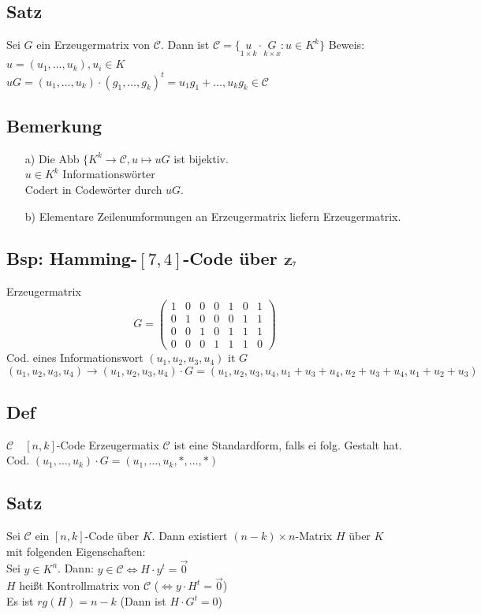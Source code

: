 \subsection{Satz}
Sei $G$ ein Erzeugermatrix von $\mathcal{C}$. Dann ist $\mathcal{C} = \lbrace \underset{1\times k}{u} \cdot \underset{k\times x}{G}: u \in K^k \rbrace$
Beweis: $u=(u_1,\ldots,u_k),u_i\in K$\\
$uG=(u_1,\ldots,u_k) \cdot (g_1,\ldots,g_k)^t=u_1g_1+\ldots,u_kg_k \in \mathcal{C}$\\
\subsection{Bemerkung}
\begin{itemize}
	\item[a)] Die Abb $\lbrace K^k \rightarrow \mathcal{C}, u \longmapsto uG$ ist bijektiv. \\
	$u \in K^k$ Informationsw\"orter \\
	Codert in Codew\"orter durch $uG$.
	\item[b)] Elementare Zeilenumformungen an Erzeugermatrix liefern Erzeugermatrix.
\end{itemize}
\subsection{Bsp: Hamming-$[7,4]$-Code \"uber $\Z_7$}
%
%
\noindent
Erzeugermatrix
\[	G=
	\begin{pmatrix}
		1 & 0 & 0 & 0 & 1 & 0 & 1\\
		0 & 1 & 0 & 0 & 0 & 1 & 1\\
		0 & 0 & 1 & 0 & 1 & 1 & 1\\
		0 & 0 & 0 & 1 & 1 & 1 & 0
	\end{pmatrix}
\]
Cod. eines Informationswort $(u_1,u_2,u_3,u_4)$ it $G$
\[
	(u_1,u_2,u_3,u_4) \rightarrow (u_1,u_2,u_3,u_4) \cdot G =  (u_1,u_2,u_3,u_4,u_1+u_3+u_4,u_2+u_3+u_4,u_1+u_2+u_3)
\]
\subsection{Def}
$\mathcal{C} \quad [n,k]$-Code Erzeugermatix $\mathcal{C}$ ist eine Standardform, falls ei folg. Gestalt hat.
%
%
Cod. $(u_1,\ldots,u_k) \cdot G = (u_1,\ldots,u_k,*,\ldots,*)$
\subsection{Satz}
Sei $\mathcal{C}$ ein $[n,k]$-Code \"uber $K$. Dann existiert $(n-k)\times n$-Matrix $H$ \"uber $K$ mit folgenden Eigenschaften: \\
Sei $y\in K^n$. Dann: $y \in \mathcal{C} \Leftrightarrow H \cdot y^t = \vec{0}$ 
\\
$H$ hei\ss t Kontrollmatrix von $\mathcal{C}$ ($\Leftrightarrow y \cdot H^t = \vec{0}$) \\
Es ist $rg(H)=n-k$ (Dann ist $H \cdot G^t=0$)

